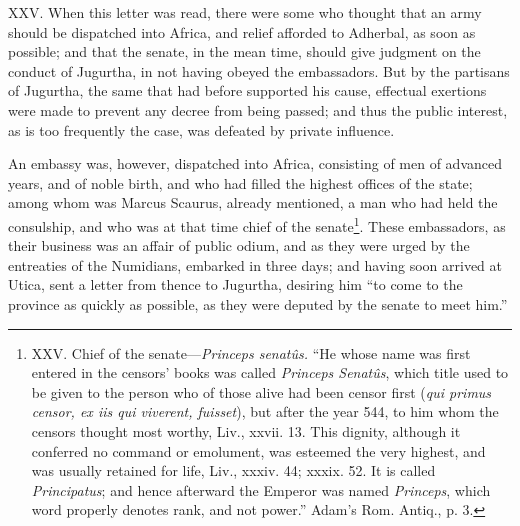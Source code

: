 XXV. When this letter was read, there were some who thought that an
army should be dispatched into Africa, and relief afforded to
Adherbal, as soon as possible; and that the senate, in the mean time,
should give judgment on the conduct of Jugurtha, in not having obeyed
the embassadors. But by the partisans of Jugurtha, the same that had
before supported his cause, effectual exertions were made to prevent
any decree from being passed; and thus the public interest, as is too
frequently the case, was defeated by private influence.

An embassy was, however, dispatched into Africa, consisting of men of
advanced years, and of noble birth, and who had filled the highest
offices of the state; among whom was Marcus Scaurus, already mentioned,
a man who had held the consulship, and who was at that time chief of
the senate\footnote{XXV. Chief of the senate—\emph{Princeps senatûs.} ``He whose name
was first entered in the censors' books was called \emph{Princeps Senatûs},
which title used to be given to the person who of those alive had been
censor first (\emph{qui primus censor, ex iis qui viverent, fuisset}), but
after the year 544, to him whom the censors thought most worthy, Liv.,
xxvii. 13. This dignity, although it conferred no command or emolument,
was esteemed the very highest, and was usually retained for life, Liv.,
xxxiv. 44; xxxix. 52. It is called \emph{Principatus}; and hence afterward
the Emperor was named \emph{Princeps}, which word properly denotes rank, and
not power.'' Adam's Rom. Antiq., p. 3.}. These embassadors, as their business was an affair of
public odium, and as they were urged by the entreaties of the Numidians,
embarked in three days; and having soon arrived at Utica, sent a letter
from thence to Jugurtha, desiring him ``to come to the province as
quickly as possible, as they were deputed by the senate to meet him.''

